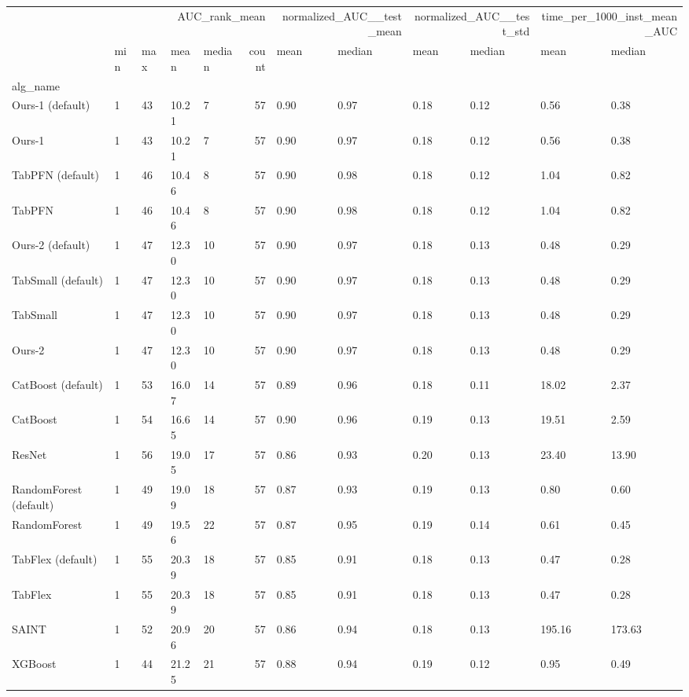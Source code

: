 \begin{tabular}{lllllrllllll}
\toprule
 & \multicolumn{5}{r}{AUC_rank_mean} & \multicolumn{2}{r}{normalized_AUC__test_mean} & \multicolumn{2}{r}{normalized_AUC__test_std} & \multicolumn{2}{r}{time_per_1000_inst_mean_AUC} \\
 & min & max & mean & median & count & mean & median & mean & median & mean & median \\
alg_name &  &  &  &  &  &  &  &  &  &  &  \\
\midrule
Ours-1 (default) & 1 & 43 & 10.21 & 7 & 57 & 0.90 & 0.97 & 0.18 & 0.12 & 0.56 & 0.38 \\
Ours-1 & 1 & 43 & 10.21 & 7 & 57 & 0.90 & 0.97 & 0.18 & 0.12 & 0.56 & 0.38 \\
TabPFN (default) & 1 & 46 & 10.46 & 8 & 57 & 0.90 & 0.98 & 0.18 & 0.12 & 1.04 & 0.82 \\
TabPFN & 1 & 46 & 10.46 & 8 & 57 & 0.90 & 0.98 & 0.18 & 0.12 & 1.04 & 0.82 \\
Ours-2 (default) & 1 & 47 & 12.30 & 10 & 57 & 0.90 & 0.97 & 0.18 & 0.13 & 0.48 & 0.29 \\
TabSmall (default) & 1 & 47 & 12.30 & 10 & 57 & 0.90 & 0.97 & 0.18 & 0.13 & 0.48 & 0.29 \\
TabSmall & 1 & 47 & 12.30 & 10 & 57 & 0.90 & 0.97 & 0.18 & 0.13 & 0.48 & 0.29 \\
Ours-2 & 1 & 47 & 12.30 & 10 & 57 & 0.90 & 0.97 & 0.18 & 0.13 & 0.48 & 0.29 \\
CatBoost (default) & 1 & 53 & 16.07 & 14 & 57 & 0.89 & 0.96 & 0.18 & 0.11 & 18.02 & 2.37 \\
CatBoost & 1 & 54 & 16.65 & 14 & 57 & 0.90 & 0.96 & 0.19 & 0.13 & 19.51 & 2.59 \\
ResNet & 1 & 56 & 19.05 & 17 & 57 & 0.86 & 0.93 & 0.20 & 0.13 & 23.40 & 13.90 \\
RandomForest (default) & 1 & 49 & 19.09 & 18 & 57 & 0.87 & 0.93 & 0.19 & 0.13 & 0.80 & 0.60 \\
RandomForest & 1 & 49 & 19.56 & 22 & 57 & 0.87 & 0.95 & 0.19 & 0.14 & 0.61 & 0.45 \\
TabFlex (default) & 1 & 55 & 20.39 & 18 & 57 & 0.85 & 0.91 & 0.18 & 0.13 & 0.47 & 0.28 \\
TabFlex & 1 & 55 & 20.39 & 18 & 57 & 0.85 & 0.91 & 0.18 & 0.13 & 0.47 & 0.28 \\
SAINT & 1 & 52 & 20.96 & 20 & 57 & 0.86 & 0.94 & 0.18 & 0.13 & 195.16 & 173.63 \\
XGBoost & 1 & 44 & 21.25 & 21 & 57 & 0.88 & 0.94 & 0.19 & 0.12 & 0.95 & 0.49 \\

\end{tabular}
